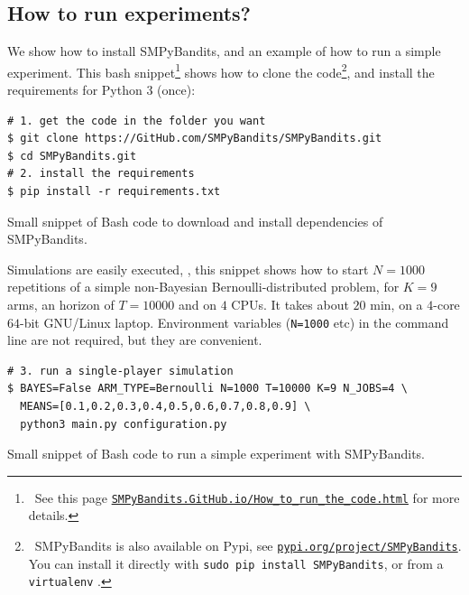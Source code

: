 \subsection{How to run experiments?}

We show how to install SMPyBandits, and an example of how to run a simple experiment.
This bash snippet\footnote{~See this page \texttt{\href{https://SMPyBandits.GitHub.io/How_to_run_the_code.html}{SMPyBandits.GitHub.io/How\_to\_run\_the\_code.html}} for more details.} shows how to clone the code\footnote{~SMPyBandits is also available on Pypi, see \texttt{\href{https://pypi.org/project/SMPyBandits/}{pypi.org/project/SMPyBandits}}. You can install it directly with \texttt{sudo pip install SMPyBandits}, or from a \texttt{virtualenv} \cite{virtualenv}.},
and install the requirements for Python 3 (once):

\begin{small}
    \begin{listing}[h!]
        \begin{verbatim}
# 1. get the code in the folder you want
$ git clone https://GitHub.com/SMPyBandits/SMPyBandits.git
$ cd SMPyBandits.git
# 2. install the requirements
$ pip install -r requirements.txt
        \end{verbatim}
        \caption{Small snippet of Bash code to download and install dependencies of SMPyBandits.}
        \label{lst:3:howToInstallLibrary}
    \end{listing}
\end{small}

Simulations are easily executed, \eg, this snippet shows how to start $N=1000$ repetitions of a simple non-Bayesian Bernoulli-distributed problem, for $K=9$ arms, an horizon of $T=10000$ and on $4$ CPUs.
It takes about $20$ min, on a $4$-core $64$-bit GNU/Linux laptop.
Environment variables (\texttt{N=1000} etc) in the command line are not required, but they are convenient.

\begin{small}
\begin{listing}[h!]
    \begin{verbatim}
# 3. run a single-player simulation
$ BAYES=False ARM_TYPE=Bernoulli N=1000 T=10000 K=9 N_JOBS=4 \
  MEANS=[0.1,0.2,0.3,0.4,0.5,0.6,0.7,0.8,0.9] \
  python3 main.py configuration.py
    \end{verbatim}
    \caption{Small snippet of Bash code to run a simple experiment with SMPyBandits.}
    \label{lst:3:howToRunBasicLibrary}
\end{listing}
\end{small}


